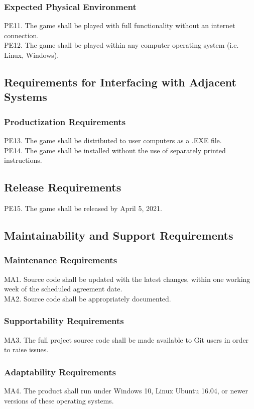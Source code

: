 \documentclass[12pt]{article}
\begin{document}
    \subsubsection{Expected Physical Environment}
    PE11. The game shall be played with full functionality without an internet connection.\\
    PE12. The game shall be played within any computer operating system (i.e. Linux, Windows).
    
\subsection{Requirements for Interfacing with Adjacent Systems}
    \subsubsection{Productization Requirements}
    PE13. The game shall be distributed to user computers as a .EXE file.\\
    PE14. The game shall be installed without the use of separately printed instructions.
    
 \subsection{Release Requirements}
    PE15. The game shall be released by April 5, 2021.
    
 \subsection{Maintainability and Support Requirements}
    \subsubsection{Maintenance Requirements}
    MA1. Source code shall be updated with the latest changes, within one working week of the scheduled agreement date.\\
    MA2. Source code shall be appropriately documented.
    
    \subsubsection{Supportability Requirements}
    MA3. The full project source code shall be made available to Git users in order to raise issues.
    
    \subsubsection{Adaptability Requirements}
    MA4. The product shall run under Windows 10, Linux Ubuntu 16.04, or newer versions of these operating systems.
    
\end{document}
